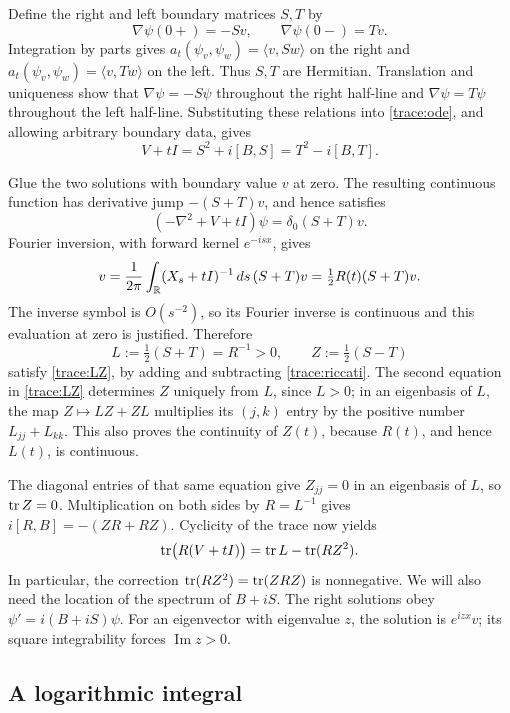 Define the right and left boundary matrices $S,T$ by
\begin{equation}\label{trace:boundary}
 \nabla\psi(0+)=-Sv,\qquad \nabla\psi(0-)=Tv.
\end{equation}
Integration by parts gives
$a_t(\psi_v,\psi_w)=\langle v,Sw\rangle$ on the right and
$a_t(\psi_v,\psi_w)=\langle v,Tw\rangle$ on the left.  Thus
$S,T$ are Hermitian.  Translation and uniqueness show that
$\nabla\psi=-S\psi$ throughout the right half-line and
$\nabla\psi=T\psi$ throughout the left half-line.
Substituting these relations into \eqref{trace:ode}, and allowing
arbitrary boundary data, gives
\begin{equation}\label{trace:riccati}
 V+tI=S^2+i[B,S]=T^2-i[B,T].
\end{equation}

Glue the two solutions with boundary value $v$ at zero.
The resulting continuous function has derivative jump
$-(S+T)v$, and hence satisfies
\[
 (-\nabla^2+V+tI)\psi=\delta_0(S+T)v.
\]
Fourier inversion, with forward kernel $e^{-isx}$, gives
\[
 v=\frac1{2\pi}\int_\mathbb R(X_s+tI)^{-1}\,ds\,(S+T)v
   =\tfrac12 R(t)(S+T)v.
\]
The inverse symbol is $O(s^{-2})$, so its Fourier inverse is
continuous and this evaluation at zero is justified.  Therefore
\[
 L:=\tfrac12(S+T)=R^{-1}>0,\qquad Z:=\tfrac12(S-T)
\]
satisfy \eqref{trace:LZ}, by adding and subtracting
\eqref{trace:riccati}.  The second equation in \eqref{trace:LZ}
determines $Z$ uniquely from $L$, since $L>0$; in an eigenbasis
of $L$, the map $Z\mapsto LZ+ZL$ multiplies its $(j,k)$ entry
by the positive number $L_{jj}+L_{kk}$.  This also proves the
continuity of $Z(t)$, because $R(t)$, and hence $L(t)$, is continuous.

The diagonal entries of that same equation give $Z_{jj}=0$
in an eigenbasis of $L$, so $\operatorname{tr} Z=0$.  Multiplication on both
sides by $R=L^{-1}$ gives
$i[R,B]=-(ZR+RZ)$.  Cyclicity of the trace now yields
\begin{equation}\label{trace:RV}
 \operatorname{tr}\bigl(R(V+tI)\bigr)=\operatorname{tr} L-\operatorname{tr}(RZ^2).
\end{equation}
In particular, the correction $\operatorname{tr}(RZ^2)=\operatorname{tr}(ZRZ)$ is nonnegative.
We will also need the location of the spectrum of $B+iS$.
The right solutions obey $\psi'=i(B+iS)\psi$.
For an eigenvector with eigenvalue $z$, the solution is $e^{izx}v$;
its square integrability forces $\operatorname{Im}z>0$.

\subsection{A logarithmic integral}

